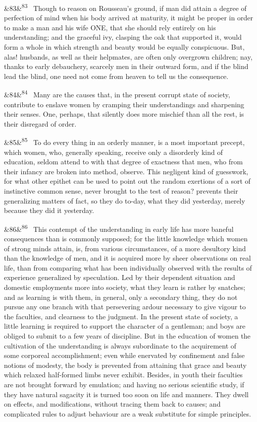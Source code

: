\documentclass[12pt]{article}
\newcommand{\para}[1][]{\par\noindent\ifx&#1&\else\textsuperscript{\footnotesize #1}~\fi}
\begin{document}
\para[83] Though to reason on Rousseau's ground, if man did attain a degree of perfection of mind when his body arrived at maturity, it might be proper in order to make a man and his wife ONE, that she should rely entirely on his understanding; and the graceful ivy, clasping the oak that supported it, would form a whole in which strength and beauty would be equally conspicuous. But, alas! husbands, as well as their helpmates, are often only overgrown children; nay, thanks to early debauchery, scarcely men in their outward form, and if the blind lead the blind, one need not come from heaven to tell us the consequence.

\para[84] Many are the causes that, in the present corrupt state of society, contribute to enslave women by cramping their understandings and sharpening their senses. One, perhaps, that silently does more mischief than all the rest, is their disregard of order.

\para[85] To do every thing in an orderly manner, is a most important precept, which women, who, generally speaking, receive only a disorderly kind of education, seldom attend to with that degree of exactness that men, who from their infancy are broken into method, observe. This negligent kind of guesswork, for what other epithet can be used to point out the random exertions of a sort of instinctive common sense, never brought to the test of reason? prevents their generalizing matters of fact, so they do to-day, what they did yesterday, merely because they did it yesterday.

\para[86] This contempt of the understanding in early life has more baneful consequences than is commonly supposed; for the little knowledge which women of strong minds attain, is, from various circumstances, of a more desultory kind than the knowledge of men, and it is acquired more by sheer observations on real life, than from comparing what has been individually observed with the results of experience generalized by speculation. Led by their dependent situation and domestic employments more into society, what they learn is rather by snatches; and as learning is with them, in general, only a secondary thing, they do not pursue any one branch with that persevering ardour necessary to give vigour to the faculties, and clearness to the judgment. In the present state of society, a little learning is required to support the character of a gentleman; and boys are obliged to submit to a few years of discipline. But in the education of women the cultivation of the understanding is always subordinate to the acquirement of some corporeal accomplishment; even while enervated by confinement and false notions of modesty, the body is prevented from attaining that grace and beauty which relaxed half-formed limbs never exhibit. Besides, in youth their faculties are not brought forward by emulation; and having no serious scientific study, if they have natural sagacity it is turned too soon on life and manners. They dwell on effects, and modifications, without tracing them back to causes; and complicated rules to adjust behaviour are a weak substitute for simple principles.
\end{document}
